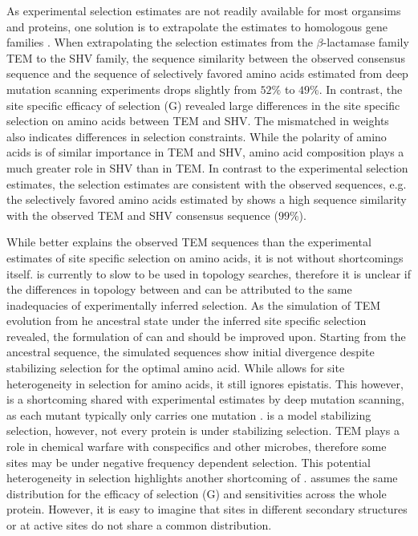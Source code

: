 \documentclass[12pt]{article}
\begin{document}
As experimental selection estimates are not readily available for most organsims and proteins, one solution is to extrapolate the estimates to homologous gene families \citep{bloom2014, bloom2017}.
When extrapolating the selection estimates from the $\beta$-lactamase family TEM to the SHV family, the sequence similarity between the observed consensus sequence and the sequence of selectively favored amino acids estimated from deep mutation scanning experiments drops slightly from $52 \% $ to $49 \%$.
In contrast, the site specific efficacy of selection (G) revealed large differences in the site specific selection on amino acids between TEM and SHV.
The mismatched in \PC weights also indicates differences in selection constraints. 
While the polarity of amino acids is of similar importance in TEM and SHV, amino acid composition plays a much greater role in SHV than in TEM.
In contrast to the experimental selection estimates, the \selac selection estimates are consistent with the observed sequences, e.g. the selectively favored amino acids estimated by \selac shows a high sequence similarity with the observed TEM and SHV consensus sequence ($99 \%$).

While \selac better explains the observed TEM sequences than the experimental estimates of site specific selection on amino acids, it is not without shortcomings itself.
\selac is currently to slow to be used in topology searches, therefore it is unclear if the differences in topology between \phydms and \selac can be attributed to the same inadequacies of experimentally inferred selection.
As the simulation of TEM evolution from he ancestral state under the \selac inferred site specific selection revealed, the formulation of \selac can and should be improved upon.
Starting from the ancestral sequence, the simulated sequences show initial divergence despite stabilizing selection for the optimal amino acid.
While \selac allows for site heterogeneity in selection for amino acids, it still ignores epistatis.
This however, is a shortcoming shared with experimental estimates by deep mutation scanning, as each mutant typically only carries one mutation \citep{FirnbergAndOstermeier2012, Jain2014}.
\selac is a model stabilizing selection, however, not every protein is under stabilizing selection.
TEM plays a role in chemical warfare with conspecifics and other microbes, therefore some sites may be under negative frequency dependent selection.
This potential heterogeneity in selection highlights another shortcoming of \selac.
\selac assumes the same distribution for the efficacy of selection (G) and \PC sensitivities across the whole protein.
However, it is easy to imagine that sites in different secondary structures or at active sites do not share a common distribution.
\end{document}

